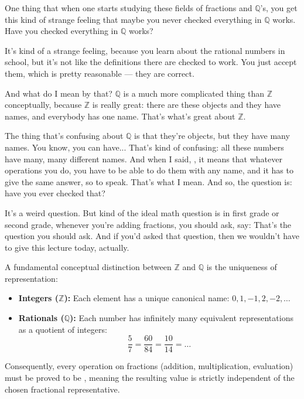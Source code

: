 \begin{speech}[00:15:30 - 00:17:25]
One thing that when one starts studying these fields of fractions and $\mathbb{Q}$'s, you get this kind of strange feeling that maybe you never checked everything in $\mathbb{Q}$ works. Have you checked everything in $\mathbb{Q}$ works?

It's kind of a strange feeling, because you learn about the rational numbers in school, but it's not like the definitions there are checked to work. You just accept them, which is pretty reasonable --- they are correct.

And what do I mean by that? $\mathbb{Q}$ is a much more complicated thing than $\mathbb{Z}$ conceptually, because $\mathbb{Z}$ is really great: there are these objects and they have names, and everybody has one name. That's what's great about $\mathbb{Z}$.

The thing that's confusing about $\mathbb{Q}$ is that they're objects, but they have many names. You know, you can have...  That's kind of confusing: all these numbers have many, many different names. And when I said, , it means that whatever operations you do, you have to be able to do them with any name, and it has to give the same answer, so to speak. That's what I mean. And so, the question is: have you ever checked that?

It's a weird question. But kind of the ideal math question is in first grade or second grade, whenever you're adding fractions, you should ask, say:  That's the question you should ask. And if you'd asked that question, then we wouldn't have to give this lecture today, actually.
\end{speech}

\begin{content}
A fundamental conceptual distinction between $\mathbb{Z}$ and $\mathbb{Q}$ is the uniqueness of representation:
\begin{itemize}
    \item \textbf{Integers ($\mathbb{Z}$):} Each element has a unique canonical name: $0, 1, -1, 2, -2, \dots$
    \item \textbf{Rationals ($\mathbb{Q}$):} Each number has infinitely many equivalent representations as a quotient of integers:
    \[
    \frac{5}{7} = \frac{60}{84} = \frac{10}{14} = \dots
    \]
\end{itemize}

Consequently, every operation on fractions (addition, multiplication, evaluation) must be proved to be , meaning the resulting value is strictly independent of the chosen fractional representative.
\end{content}

